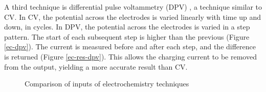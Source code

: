 A third technique is differential pulse voltammetry (DPV) \cite{kissinger1996sac}, a technique similar to CV. In CV, the potential across the electrodes is varied linearly with time up and down, in cycles. In DPV, the potential across the electrodes is varied in a step pattern. The start of each subsequent step is higher than the previous (Figure \ref{ec-dpv}). The current is measured before and after each step, and the difference is returned (Figure \ref{ec-res-dpv}). This allows the charging current to be removed from the output, yielding a more accurate result than CV.

\begin{figure}
	\centering
	\caption{Comparison of inputs of electrochemistry techniques}
\end{figure}

